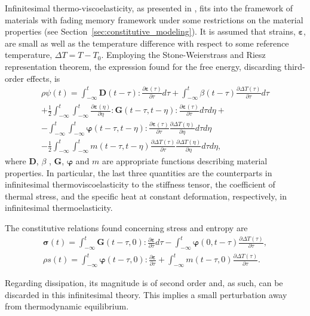 Infinitesimal thermo-viscoelasticity, as presented in \cite{christensen2013theory}, fits into the framework of materials with fading memory framework under some restrictions on the material properties (see Section~\ref{sec:constitutive_modeling}).
It is assumed that strains, $\bm \varepsilon$, are small as well as the temperature difference with respect to some reference temperature, $\Delta T=T-T_0$.
Employing the Stone-Weierstrass and Riesz representation theorem, the expression found for the free energy, discarding third-order effects, is
\begin{multline}
  \rho\psi(t) = \int_{-\infty}^t \mathbf D(t-\tau):\frac{\partial \bm\varepsilon(\tau)}{\partial \tau}d\tau + \int_{-\infty}^t \beta(t-\tau)\frac{\partial \Delta T(\tau)}{\partial \tau}d\tau\\ + \frac{1}{2}\int_{-\infty}^t\int_{-\infty}^t \frac{\partial \bm\varepsilon(\eta)}{\partial \eta}:\mathbf G(t-\tau, t-\eta):\frac{\partial \bm \varepsilon(\tau)}{\partial \tau}d\tau d\eta + \\
  -\int_{-\infty}^t \int_{-\infty}^t \bm\varphi(t-\tau, t-\eta):\frac{\partial \bm\varepsilon(\tau)}{\partial \tau} \frac{\partial \Delta T(\eta)}{\partial \eta} d \tau d \eta\\
  -\frac{1}{2} \int_{-\infty}^t \int_{-\infty}^t m(t-\tau, t-\eta) \frac{\partial \Delta T(\tau)}{\partial \tau} \frac{\partial \Delta T(\eta)}{\partial \eta} d \tau d \eta,
  \end{multline}
where $\mathbf D$, $\beta$ , $\mathbf G$, $\bm \varphi$ and $m$ are appropriate functions describing  material properties.
In particular, the last three quantities are the counterparts in infinitesimal thermoviscoelasticity to the stiffness tensor, the coefficient of thermal stress, and the specific heat at constant deformation, respectively, in infinitesimal thermoelasticity.

The constitutive relations found concerning stress and entropy are
\begin{gather}
  \bm \sigma(t) = \int_{-\infty}^t \mathbf G(t-\tau, 0):\frac{\partial\bm\varepsilon}{\partial \tau} d\tau-\int_{-\infty}^t \bm\varphi(0, t-\tau)\frac{\partial \Delta T(\tau)}{\partial \tau},\\
  \rho s(t) = \int_{-\infty}^t \bm\varphi(t-\tau, 0):\frac{\partial \bm \varepsilon}{\partial \tau} + \int_{-\infty}^t m(t-\tau, 0)\frac{\partial \Delta T(\tau)}{\partial \tau}.
\end{gather}

Regarding dissipation, its magnitude is of second order and, as such, can be discarded in this infinitesimal theory.
This implies a small perturbation away from thermodynamic equilibrium.

